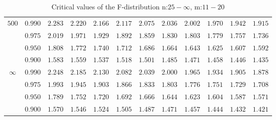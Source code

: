 \documentclass[11pt]{article}
\theoremstyle{definition}
\begin{document}
\begin{table}[H]
\begin{tabularx}{\linewidth}{c | c | c c c c c c c c c c}
		$500$ & $0.990$ & $2.283$ & $2.220$ & $2.166$ & $2.117$ & $2.075$ & $2.036$ & $2.002$ & $1.970$ & $1.942$ & $1.915$ \\
		& $0.975$ & $2.019$ & $1.971$ & $1.929$ & $1.892$ & $1.859$ & $1.830$ & $1.803$ & $1.779$ & $1.757$ & $1.736$ \\
		& $0.950$ & $1.808$ & $1.772$ & $1.740$ & $1.712$ & $1.686$ & $1.664$ & $1.643$ & $1.625$ & $1.607$ & $1.592$ \\
		& $0.900$ & $1.583$ & $1.559$ & $1.537$ & $1.518$ & $1.501$ & $1.485$ & $1.471$ & $1.458$ & $1.446$ & $1.435$ \\
		$\infty$ & $0.990$ & $2.248$ & $2.185$ & $2.130$ & $2.082$ & $2.039$ & $2.000$ & $1.965$ & $1.934$ & $1.905$ & $1.878$ \\
		& $0.975$ & $1.993$ & $1.945$ & $1.903$ & $1.866$ & $1.833$ & $1.803$ & $1.776$ & $1.751$ & $1.729$ & $1.708$ \\
		& $0.950$ & $1.789$ & $1.752$ & $1.720$ & $1.692$ & $1.666$ & $1.644$ & $1.623$ & $1.604$ & $1.587$ & $1.571$ \\
		& $0.900$ & $1.570$ & $1.546$ & $1.524$ & $1.505$ & $1.487$ & $1.471$ & $1.457$ & $1.444$ & $1.432$ & $1.421$
	\end{tabularx}
	\caption{Critical values of the F-distribution n:$25-\infty$, m:$11-20$}
\end{table}
\end{document}
